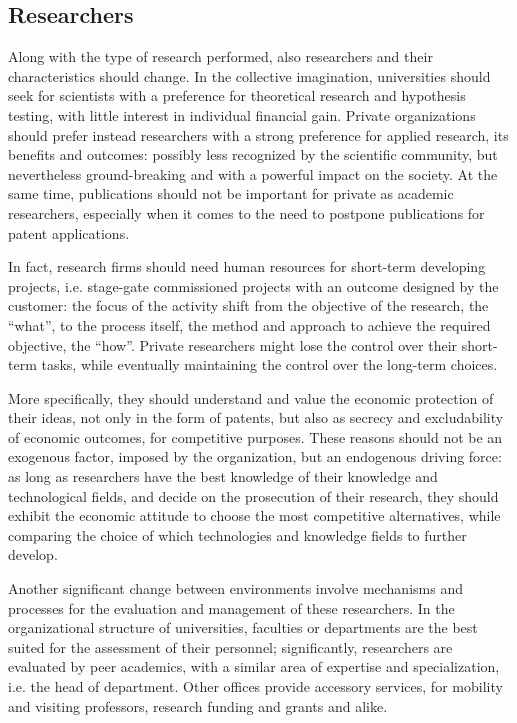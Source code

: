 \subsection{Researchers}

Along with the type of research performed, also researchers and their characteristics should change. In the collective imagination, universities should seek for scientists with a preference for theoretical research and hypothesis testing, with little interest in individual financial gain. Private organizations should prefer instead researchers with a strong preference for applied research, its benefits and outcomes: possibly less recognized by the scientific community, but nevertheless ground-breaking and with a powerful impact on the society. At the same time, publications should not be important for private as academic researchers, especially when it comes to the need to postpone publications for patent applications.  

In fact, research firms should need human resources for short-term developing projects, i.e. stage-gate commissioned projects with an outcome designed by the customer: the focus of the activity shift from the objective of the research, the \enquote{what}, to the process itself, the method and approach to achieve the required objective, the \enquote{how}. Private researchers might lose the control over their short-term tasks, while eventually maintaining the control over the long-term choices.

More specifically, they should understand and value the economic protection of their ideas, not only in the form of patents, but also as secrecy and excludability of economic outcomes, for competitive purposes. These reasons should not be an exogenous factor, imposed by the organization, but an endogenous driving force: as long as researchers have the best knowledge of their knowledge and technological fields, and decide on the prosecution of their research, they should exhibit the economic attitude to choose the most competitive alternatives, while comparing the choice of which technologies and knowledge fields to further develop.

Another significant change between environments involve mechanisms and processes for the evaluation and management of these researchers. In the organizational structure of universities, faculties or departments are the best suited for the assessment of their personnel; significantly, researchers are evaluated by peer academics, with a similar area of expertise and specialization, i.e. the head of department. Other offices provide accessory services, for mobility and visiting professors, research funding and grants and alike.

